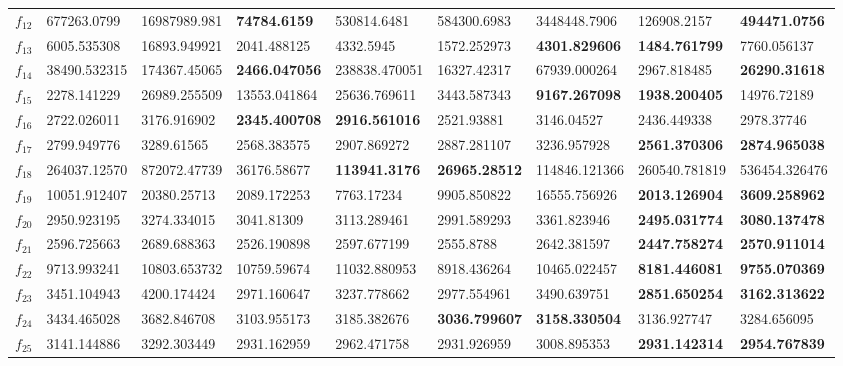 \begin{table*}[t]
\begin{tabular}{|p{0.8cm}|p{1.6cm}|p{1.6cm}|p{1.6cm}|p{1.6cm}|p{1.6cm}|p{1.6cm}|p{1.6cm}|p{1.6cm}|}
$f_{12}$  & 677263.0799 & 16987989.981 & \textbf{74784.6159} & 530814.6481 & 584300.6983 & 3448448.7906 & 126908.2157 & \textbf{494471.0756} \\ 
$f_{13}$  & 6005.535308 & 16893.949921 & 2041.488125 & 4332.5945 & 1572.252973 & \textbf{4301.829606} & \textbf{1484.761799} & 7760.056137 \\ 
$f_{14}$  & 38490.532315 & 174367.45065 & \textbf{2466.047056} & 238838.470051 & 16327.42317 & 67939.000264 & 2967.818485 & \textbf{26290.31618} \\ 
$f_{15}$  & 2278.141229 & 26989.255509 & 13553.041864 & 25636.769611 & 3443.587343 & \textbf{9167.267098} & \textbf{1938.200405} & 14976.72189 \\ 
$f_{16}$  & 2722.026011 & 3176.916902 & \textbf{2345.400708} & \textbf{2916.561016} & 2521.93881 & 3146.04527 & 2436.449338 & 2978.37746 \\ 
$f_{17}$  & 2799.949776 & 3289.61565 & 2568.383575 & 2907.869272 & 2887.281107 & 3236.957928 & \textbf{2561.370306} & \textbf{2874.965038} \\ 
$f_{18}$  & 264037.12570 & 872072.47739 & 36176.58677 & \textbf{113941.3176} & \textbf{26965.28512} & 114846.121366 & 260540.781819 & 536454.326476 \\ 
$f_{19}$  & 10051.912407 & 20380.25713 & 2089.172253 & 7763.17234 & 9905.850822 & 16555.756926 & \textbf{2013.126904} & \textbf{3609.258962} \\ 
$f_{20}$  & 2950.923195 & 3274.334015 & 3041.81309 & 3113.289461 & 2991.589293 & 3361.823946 & \textbf{2495.031774} & \textbf{3080.137478} \\ 
$f_{21}$  & 2596.725663 & 2689.688363 & 2526.190898 & 2597.677199 & 2555.8788 & 2642.381597 & \textbf{2447.758274} & \textbf{2570.911014} \\ 
$f_{22}$  & 9713.993241 & 10803.653732 & 10759.59674 & 11032.880953 & 8918.436264 & 10465.022457 & \textbf{8181.446081} & \textbf{9755.070369} \\ 
$f_{23}$ & 3451.104943 & 4200.174424 & 2971.160647 & 3237.778662 & 2977.554961 & 3490.639751 & \textbf{2851.650254} & \textbf{3162.313622} \\ 
$f_{24}$  & 3434.465028 & 3682.846708 & 3103.955173 & 3185.382676 & \textbf{3036.799607} & \textbf{3158.330504} & 3136.927747 & 3284.656095 \\ 
$f_{25}$  & 3141.144886 & 3292.303449 & 2931.162959 & 2962.471758 & 2931.926959 & 3008.895353 & \textbf{2931.142314} & \textbf{2954.767839} \\ 

\end{tabular}
\end{table*}
